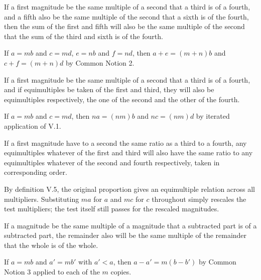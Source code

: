 \documentclass{rrxiv}
\begin{document}
\begin{claim}
\label{prop:V.2}
If a first magnitude be the same multiple of a second that a third is
of a fourth, and a fifth also be the same multiple of the second that
a sixth is of the fourth, then the sum of the first and fifth will
also be the same multiple of the second that the sum of the third and
sixth is of the fourth.
\end{claim}
\begin{evidence}[Proof of V.2]
\label{ev:V.2}
If $a = mb$ and $c = md$, $e = nb$ and $f = nd$, then $a + e = (m+n)b$
and $c + f = (m+n)d$ by Common Notion 2.
\end{evidence}

\begin{claim}
\label{prop:V.3}
If a first magnitude be the same multiple of a second that a third is
of a fourth, and if equimultiples be taken of the first and third,
they will also be equimultiples respectively, the one of the second
and the other of the fourth.
\end{claim}
\begin{evidence}[Proof of V.3]
\label{ev:V.3}
If $a = mb$ and $c = md$, then $na = (nm)b$ and $nc = (nm)d$ by
iterated application of V.1.
\end{evidence}

\begin{claim}
\label{prop:V.4}
If a first magnitude have to a second the same ratio as a third to a
fourth, any equimultiples whatever of the first and third will also
have the same ratio to any equimultiples whatever of the second and
fourth respectively, taken in corresponding order.
\end{claim}
\begin{evidence}[Proof of V.4]
\label{ev:V.4}
By definition V.5, the original proportion gives an equimultiple
relation across all multipliers.  Substituting $m a$ for $a$ and $m c$
for $c$ throughout simply rescales the test multipliers; the test
itself still passes for the rescaled magnitudes.
\end{evidence}

\begin{claim}
\label{prop:V.5}
If a magnitude be the same multiple of a magnitude that a subtracted
part is of a subtracted part, the remainder also will be the same
multiple of the remainder that the whole is of the whole.
\end{claim}
\begin{evidence}[Proof of V.5]
\label{ev:V.5}
If $a = mb$ and $a' = mb'$ with $a' < a$, then $a - a' = m(b - b')$
by Common Notion 3 applied to each of the $m$ copies.
\end{evidence}
\end{document}
